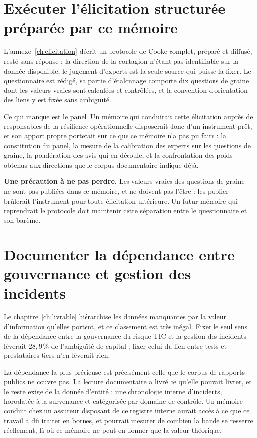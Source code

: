 \section{Exécuter l'élicitation structurée préparée par ce mémoire}

L'annexe~\ref{ch:elicitation} décrit un protocole de Cooke complet, préparé et diffusé, resté
sans réponse : la direction de la contagion n'étant pas identifiable sur la donnée disponible, le
jugement d'experts est la seule source qui puisse la fixer. Le questionnaire est rédigé, sa partie d'étalonnage
comporte dix questions de graine dont les valeurs vraies sont calculées et contrôlées, et la
convention d'orientation des liens y est fixée sans ambiguïté.

Ce qui manque est le panel. Un mémoire qui conduirait cette élicitation auprès de responsables de
la résilience opérationnelle disposerait donc d'un instrument prêt, et son apport propre porterait
sur ce que ce mémoire n'a pas pu faire : la constitution du panel, la mesure de la calibration des
experts sur les questions de graine, la pondération des avis qui en découle, et la confrontation
des poids obtenus aux directions que le corpus documentaire indique déjà.

\begin{attention}
\textbf{Une précaution à ne pas perdre.} Les valeurs vraies des questions de graine ne sont pas
publiées dans ce mémoire, et ne doivent pas l'être : les publier brûlerait l'instrument pour toute
élicitation ultérieure. Un futur mémoire qui reprendrait le protocole doit maintenir cette
séparation entre le questionnaire et son barème.
\end{attention}

\section{Documenter la dépendance entre gouvernance et gestion des incidents}

Le chapitre~\ref{ch:livrable} hiérarchise les données manquantes par la valeur d'information
qu'elles portent, et ce classement est très inégal. Fixer le seul sens de la dépendance entre la
gouvernance du risque TIC et la gestion des incidents lèverait $28{,}9\,\%$ de
l'ambiguïté de capital ; fixer celui du lien entre tests et prestataires tiers n'en lèverait rien.

La dépendance la plus précieuse est précisément celle que le corpus de rapports publics ne couvre
pas. La lecture documentaire a livré ce qu'elle pouvait livrer, et le reste exige de la donnée
d'entité : une chronologie interne d'incidents, horodatée à la survenance et catégorisée par
domaine de contrôle. Un mémoire conduit chez un assureur disposant de ce registre interne aurait
accès à ce que ce travail a dû traiter en bornes, et pourrait mesurer de combien la bande se
resserre réellement, là où ce mémoire ne peut en donner que la valeur théorique.

